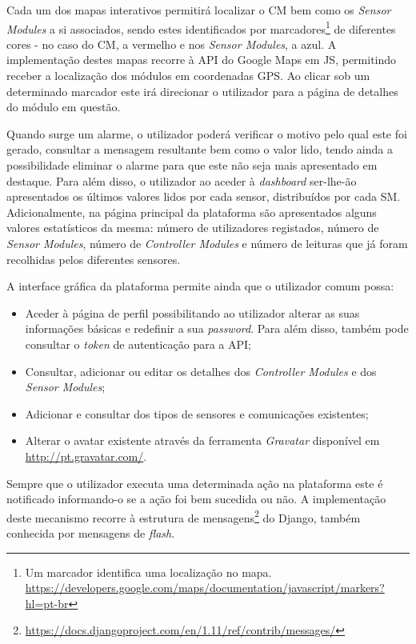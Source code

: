 Cada um dos mapas interativos permitirá localizar o \acl{CM} bem como os \textit{Sensor Modules} a si associados, sendo estes identificados por marcadores\footnote{Um marcador identifica uma localização no mapa. \\ \url{https://developers.google.com/maps/documentation/javascript/markers?hl=pt-br}} de diferentes cores - no caso do \acl{CM}, a vermelho e nos \textit{Sensor Modules}, a azul. A implementação destes mapas recorre à \ac{API} do Google Maps em \ac{JS}, permitindo receber a localização dos módulos em coordenadas \ac{GPS}. Ao clicar sob um determinado marcador este irá direcionar o utilizador para a página de detalhes do módulo em questão. 


Quando surge um  alarme, o utilizador poderá verificar o motivo pelo qual este foi gerado, consultar a mensagem resultante bem como o valor lido, tendo ainda a possibilidade eliminar o alarme para que este não seja mais apresentado em destaque. Para além disso, o utilizador ao aceder à \textit{dashboard} ser-lhe-ão apresentados os últimos valores lidos por cada sensor, distribuídos por cada \acl{SM}. Adicionalmente, na página principal da plataforma são apresentados alguns valores estatísticos da mesma: número de utilizadores registados, número de \textit{Sensor Modules}, número de \textit{Controller Modules} e número de leituras que já foram recolhidas pelos diferentes sensores. 


A interface gráfica da plataforma permite ainda que o utilizador comum possa: 

\begin{itemize}
	\item Aceder à página de perfil possibilitando ao utilizador alterar as suas informações básicas e redefinir a sua \textit{password}. Para além disso, também pode consultar o \textit{token} de autenticação para a  \ac{API}; 
	
	\item Consultar, adicionar ou editar os detalhes dos \textit{Controller Modules} e dos \textit{Sensor Modules}; 
	
	\item Adicionar e consultar dos tipos de sensores e comunicações existentes; 
	
	\item Alterar o avatar existente através da ferramenta \textit{Gravatar} disponível em \url{http://pt.gravatar.com/}. 
\end{itemize}

Sempre que o utilizador executa uma determinada ação na plataforma este é notificado informando-o se a ação foi bem sucedida ou não. A implementação deste mecanismo recorre à estrutura de mensagens\footnote{\url{https://docs.djangoproject.com/en/1.11/ref/contrib/messages/}} do Django, também conhecida por mensagens de \textit{flash}. 


